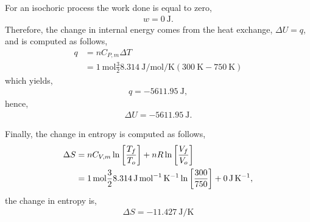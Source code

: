 \documentclass[main.tex]{subfiles}
\begin{document}
For an isochoric process the work done is equal to zero,
\begin{gather*}
    \boxed{w = \SI{0}{\joule}.}
\end{gather*}
Therefore, the change in internal energy comes from the heat exchange, $\Delta U = q$, and is computed as follows,
\begin{align*}
    q &= n C_{P,m}\Delta T \\
    &= \SI{1}{\mole}\frac{3}{2}\SI{8.314}{\joule\per\mol\per\kelvin}\left(\SI{300}{\kelvin}-\SI{750}{\kelvin}\right)
\end{align*}
which yields,
\begin{gather*}
    \boxed{q = -\SI{5611.95}{\joule},}
\end{gather*}
hence,
\begin{gather*}
    \boxed{\Delta U = -\SI{5611.95}{\joule}.}
\end{gather*}

Finally, the change in entropy is computed as follows,
\begin{align*}
    \Delta S &= nC_{V,m}\ln\qty[\frac{T_f}{T_o}] + nR\ln\qty[\frac{V_f}{V_o}] \\
    &= \SI{1}{\mol}\frac{3}{2}\SI{8.314}{\joule\per\mole\per\kelvin}\ln\qty[\frac{300}{750}]+
    \SI{0}{\joule\per\kelvin},
\end{align*}
the change in entropy is,
\begin{gather*}
    \boxed{\Delta S = -\SI{11.427}{\joule\per\kelvin}}
\end{gather*}
\end{document}
